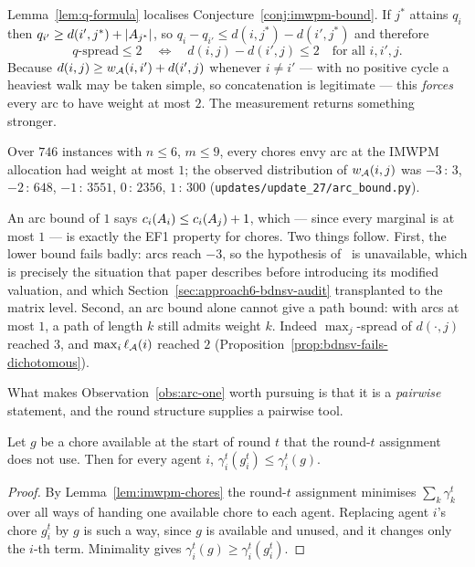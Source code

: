 Lemma~\ref{lem:q-formula} localises Conjecture~\ref{conj:imwpm-bound}. If $j^*$
attains $q_i$ then $q_{i'} \ge d(i',j^*) + \left\lvert A_{j^*}\right\rvert$, so
$q_i - q_{i'} \le d(i,j^*) - d(i',j^*)$ and therefore
\[
  \text{$q$-spread} \le 2
  \quad\Longleftrightarrow\quad
  d(i,j) - d(i',j) \le 2 \quad \text{for all } i,i',j .
\]
Because $d(i,j) \ge w_{\mathcal{A}}(i,i') + d(i',j)$ whenever $i \ne i'$ --- with no
positive cycle a heaviest walk may be taken simple, so concatenation is
legitimate --- this \emph{forces} every arc to have weight at most $2$. The
measurement returns something stronger.

\begin{observation}
\label{obs:arc-one}
Over $746$ instances with $n \le 6$, $m \le 9$, every chores envy arc at the
IMWPM allocation had weight at most $1$; the observed distribution of
$w_{\mathcal{A}}(i,j)$ was $-3\,{:}\,3$, $-2\,{:}\,648$, $-1\,{:}\,3551$,
$0\,{:}\,2356$, $1\,{:}\,300$ (\texttt{updates/update\_27/arc\_bound.py}).
\end{observation}

An arc bound of $1$ says $c_i(A_{i}) \le c_i(A_{j}) + 1$, which
--- since every marginal is at most $1$ --- is exactly the EF1 property for
chores. Two things follow. First, the lower bound fails badly: arcs reach $-3$,
so the hypothesis of~\cite[Lemma~4.1]{BDNSV20} is unavailable, which is precisely
the situation that paper describes before introducing its modified valuation, and
which Section~\ref{sec:approach6-bdnsv-audit} transplanted to the matrix level.
Second, an arc bound alone cannot give a path bound: with arcs at most $1$, a
path of length $k$ still admits weight $k$. Indeed $\max_j$-spread of $d(\cdot,j)$
reached $3$, and $\max_i \ell_{\mathcal{A}}(i)$ reached $2$
(Proposition~\ref{prop:bdnsv-fails-dichotomous}).

What makes Observation~\ref{obs:arc-one} worth pursuing is that it is a
\emph{pairwise} statement, and the round structure supplies a pairwise tool.

\begin{lemma}
\label{lem:round-dominance}
Let $g$ be a chore available at the start of round $t$ that the round-$t$
assignment does not use. Then for every agent $i$,
$\gamma_i^t(g_i^t) \le \gamma_i^t(g)$.
\end{lemma}

\begin{proof}
By Lemma~\ref{lem:imwpm-chores} the round-$t$ assignment minimises
$\sum_k \gamma_k^t$ over all ways of handing one available chore to each agent.
Replacing agent $i$'s chore $g_i^t$ by $g$ is such a way, since $g$ is available
and unused, and it changes only the $i$-th term. Minimality gives
$\gamma_i^t(g) \ge \gamma_i^t(g_i^t)$.
\end{proof}

